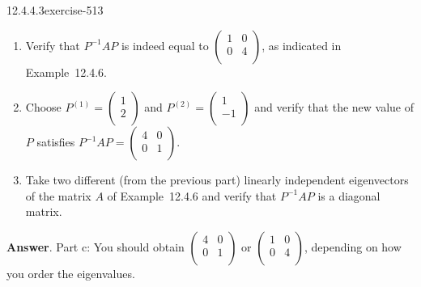 \documentclass[twoside,10pt,]{book}
\numberwithin{equation}{section}
\begin{document}
\begin{divisionsolution}{12.4.4.3}{}{exercise-513}%
\hypertarget{p-4625}{}%
\leavevmode%
\begin{enumerate}[label=(\alph*)]
\item\hypertarget{li-2107}{}\hypertarget{p-4626}{}%
Verify that \(P^{-1} A P\) is indeed equal to \(\left(
\begin{array}{cc}
1 & 0 \\
0 & 4 \\
\end{array}
\right)\),  as indicated in Example~12.4.6.%
\item\hypertarget{li-2108}{}\hypertarget{p-4627}{}%
Choose \(P^{(1)}=\left(
\begin{array}{c}
1 \\
2 \\
\end{array}
\right)\) and \(P^{(2)}=\left(
\begin{array}{c}
1 \\
-1 \\
\end{array}
\right)\) and verify that the new value of \(P\) satisfies \(P^{-1} A P=\left(
\begin{array}{cc}
4 & 0 \\
0 & 1 \\
\end{array}
\right)\).%
\item\hypertarget{li-2109}{}\hypertarget{p-4628}{}%
Take two different (from the previous part) linearly independent eigenvectors of the matrix \(A\) of Example~12.4.6 and verify that \(P^{-1} A P\) is a diagonal matrix.%
\end{enumerate}
%
\par\smallskip%
\noindent\textbf{Answer}.\quad%
\hypertarget{p-4629}{}%
Part c: You should obtain \(\left(
\begin{array}{cc}
4 & 0 \\
0 & 1 \\
\end{array}
\right)\) or \(\left(
\begin{array}{cc}
1 & 0 \\
0 & 4 \\
\end{array}
\right)\), depending on how you order the eigenvalues.%
\end{divisionsolution}%
\end{document}

